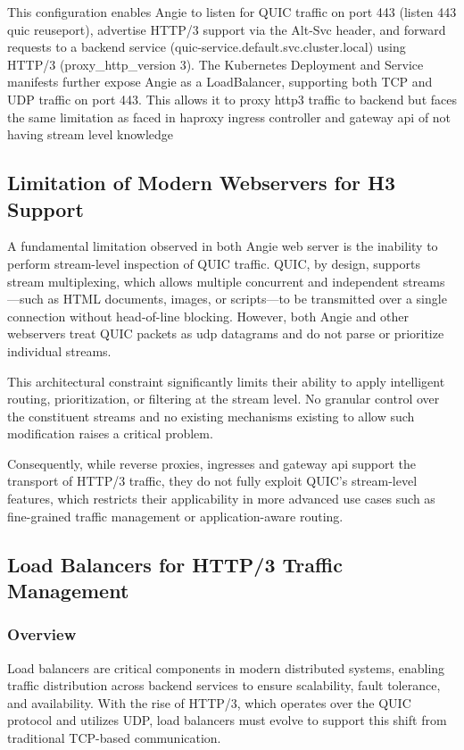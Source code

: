 This configuration enables Angie to listen for QUIC traffic on port 443 (listen 443 quic reuseport), advertise HTTP/3 support via the Alt-Svc header, and forward requests to a backend service (quic-service.default.svc.cluster.local) using HTTP/3 (proxy\_http\_version 3). The Kubernetes Deployment and Service manifests further expose Angie as a LoadBalancer, supporting both TCP and UDP traffic on port 443.
This allows it to proxy http3 traffic to backend but faces the same limitation as faced in haproxy ingress controller and gateway api of not having stream level knowledge

\subsection{Limitation of Modern Webservers for H3 Support}
A fundamental limitation observed in both Angie web server is the inability to perform stream-level inspection of QUIC traffic. QUIC, by design, supports stream multiplexing, which allows multiple concurrent and independent streams—such as HTML documents, images, or scripts—to be transmitted over a single connection without head-of-line blocking. However, both Angie and other webservers treat QUIC packets as udp datagrams and do not parse or prioritize individual streams.

This architectural constraint significantly limits their ability to apply intelligent routing, prioritization, or filtering at the stream level. No granular control over the constituent streams and no existing mechanisms existing to allow such modification raises a critical problem. 

Consequently, while reverse proxies, ingresses and gateway api support the transport of HTTP/3 traffic, they do not fully exploit QUIC's stream-level features, which restricts their applicability in more advanced use cases such as fine-grained traffic management or application-aware routing.

\subsection{Load Balancers for HTTP/3 Traffic Management}
\subsubsection{Overview}
Load balancers are critical components in modern distributed systems, enabling traffic distribution across backend services to ensure scalability, fault tolerance, and availability. With the rise of HTTP/3, which operates over the QUIC protocol and utilizes UDP, load balancers must evolve to support this shift from traditional TCP-based communication.

